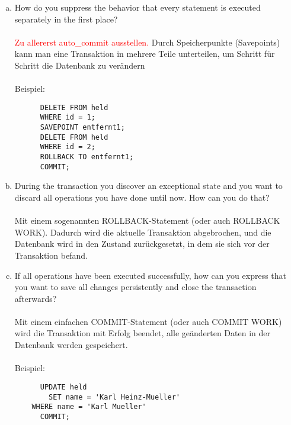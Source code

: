 \documentclass[11pt,a4paper,DIV=9]{scrartcl}
\begin{document}
      \begin{enumerate}[a.]
      \item How do you suppress the behavior that every statement is executed separately in the first place? \\\\
      \textcolor{red}{Zu allererst auto\_commit ausstellen.} Durch Speicherpunkte (Savepoints) kann man eine Transaktion in mehrere Teile unterteilen, um Schritt f\"ur Schritt die Datenbank zu ver\"andern \\\\
      Beispiel:
      \begin{lstlisting}
      DELETE FROM held
      WHERE id = 1;  
      SAVEPOINT entfernt1;   
      DELETE FROM held
      WHERE id = 2;    
      ROLLBACK TO entfernt1;
      COMMIT;
      \end{lstlisting}
      \item During the transaction you discover an exceptional state and you want to discard all operations you have done until now. How can you do that? \\\\
      Mit einem sogenannten ROLLBACK-Statement (oder auch ROLLBACK WORK). Dadurch wird die aktuelle Transaktion abgebrochen, und die Datenbank wird in den Zustand zur\"uckgesetzt, in dem sie sich vor der Transaktion befand.     
      \item If all operations have been executed successfully, how can you express that you want to save all changes persistently and close the transaction afterwards? \\\\
      Mit einem einfachen COMMIT-Statement (oder auch COMMIT WORK) wird die Transaktion mit Erfolg beendet, alle ge\"anderten Daten in der Datenbank werden gespeichert. \\\\
      Beispiel:
      \begin{lstlisting}
      UPDATE held
      	SET name = 'Karl Heinz-Mueller'
	WHERE name = 'Karl Mueller'
      COMMIT;
      \end{lstlisting}
      \end{enumerate}
\end{document}
